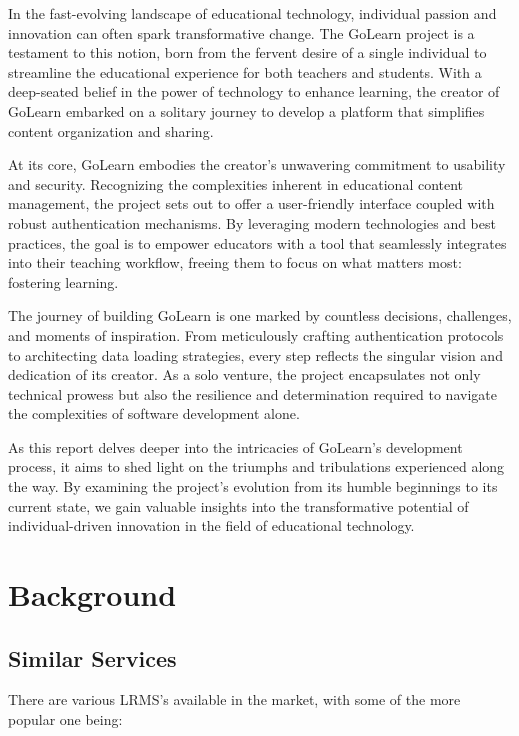 \documentclass[11pt, a4paper,twoside]{report}
\theoremstyle{plain} %
\theoremstyle{definition} %
\numberwithin{equation}{chapter}
\begin{document}
In the fast-evolving landscape of educational technology, individual passion
and innovation can often spark transformative change. The GoLearn project is a
testament to this notion, born from the fervent desire of a single individual
to streamline the educational experience for both teachers and students. With a
deep-seated belief in the power of technology to enhance learning, the creator
of GoLearn embarked on a solitary journey to develop a platform that simplifies
content organization and sharing.

At its core, GoLearn embodies the creator's unwavering commitment to usability
and security. Recognizing the complexities inherent in educational content
management, the project sets out to offer a user-friendly interface coupled
with robust authentication mechanisms. By leveraging modern technologies and
best practices, the goal is to empower educators with a tool that seamlessly
integrates into their teaching workflow, freeing them to focus on what matters
most: fostering learning.

The journey of building GoLearn is one marked by countless decisions,
challenges, and moments of inspiration. From meticulously crafting
authentication protocols to architecting data loading strategies, every step
reflects the singular vision and dedication of its creator. As a solo venture,
the project encapsulates not only technical prowess but also the resilience and
determination required to navigate the complexities of software development
alone.

As this report delves deeper into the intricacies of GoLearn's development
process, it aims to shed light on the triumphs and tribulations experienced
along the way. By examining the project's evolution from its humble beginnings
to its current state, we gain valuable insights into the transformative
potential of individual-driven innovation in the field of educational
technology.


\chapter{Background}\label{ch:background}

\section{Similar Services}\label{sec:similarservices}

There are various LRMS's available in the market, with some of the more popular
one being:
\end{document}
